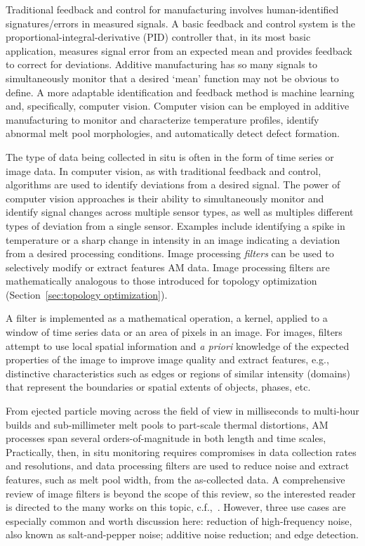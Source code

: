 Traditional feedback and control for manufacturing involves human-identified signatures/errors in measured signals. A basic feedback and control system is the proportional-integral-derivative (PID) controller that, in its most basic application, measures signal error from an expected mean and provides feedback to correct for deviations. Additive manufacturing has so many signals to simultaneously monitor that a desired `mean' function may not be obvious to define. A more adaptable identification and feedback method is machine learning and, specifically, computer vision. Computer vision can be employed in additive manufacturing to monitor and characterize temperature profiles, identify abnormal melt pool morphologies, and automatically detect defect formation. 

The type of data being collected in situ is often in the form of time series or image data. In computer vision, as with traditional feedback and control, algorithms are used to identify deviations from a desired signal. The power of computer vision approaches is their ability to simultaneously monitor and identify signal changes across multiple sensor types, as well as multiples different types of deviation from a single sensor. Examples include identifying a spike in temperature or a sharp change in intensity in an image indicating a deviation from a desired processing conditions. Image processing \textit{filters} can be used to selectively modify or extract features AM data. Image processing filters are mathematically analogous to those introduced for topology optimization (Section~\ref{sec:topology optimization}).

A filter is implemented as a mathematical operation, a kernel, applied to a window of time series data or an area of pixels in an image. For images, filters attempt to use local spatial information and \textit{a priori} knowledge of the expected properties of the image to improve image quality and extract features, e.g., distinctive characteristics such as edges or regions of similar intensity (domains) that represent the boundaries or spatial extents of objects, phases, etc. 

From ejected particle moving across the field of view in milliseconds to multi-hour builds and sub-millimeter melt pools to part-scale thermal distortions, AM processes span several orders-of-magnitude in both length and time scales, Practically, then, in situ monitoring requires compromises in data collection rates and resolutions, and data processing filters are used to reduce noise and extract features, such as melt pool width, from the as-collected data. A comprehensive review of image filters is beyond the scope of this review, so the interested reader is directed to the many works on this topic, c.f.,~\citet{Vernon1991}. However, three use cases are especially common and worth discussion here: reduction of high-frequency noise, also known as salt-and-pepper noise; additive noise reduction; and edge detection.

